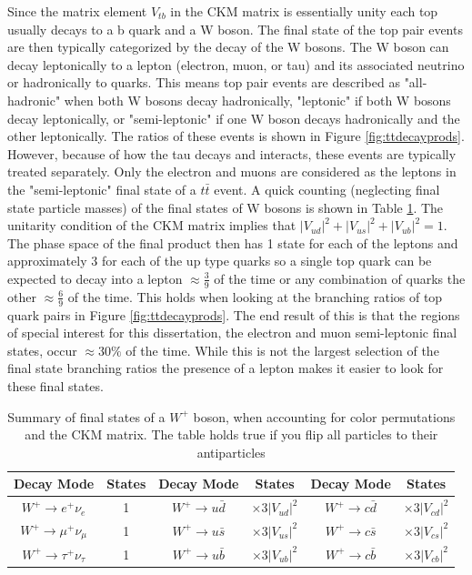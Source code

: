 Since the matrix element $V_{tb}$ in the CKM matrix is essentially unity each top usually decays to a b quark and a W boson.  The final state of the top pair events are then typically categorized by the decay of the W bosons.  The W boson can decay leptonically to a lepton (electron, muon, or tau) and its associated neutrino or hadronically to quarks.  This means top pair events are described as "all-hadronic" when both W bosons decay hadronically, "leptonic" if both W bosons decay leptonically, or "semi-leptonic" if one W boson decays hadronically and the other leptonically.  The ratios of these events is shown in Figure \ref{fig:ttdecayprods}.  However, because of how the tau decays and interacts, these events are typically treated separately.  Only the electron and muons are considered as the leptons in the "semi-leptonic" final state of a $t\bar{t}$ event.  A quick counting (neglecting final state particle masses) of the final states of W bosons  is shown in Table \ref{tab:WFinals}.  The unitarity condition of the CKM matrix implies that $|V_{ud}|^2 + |V_{us}|^2 + |V_{ub}|^2 =1$.  The phase space of the final product then has 1 state for each of the leptons and approximately 3 for each of the up type quarks so a single top quark can be expected to decay into a lepton $\approx \frac{3}{9}$ of the time or any combination of quarks the other $\approx \frac{6}{9}$ of the time.  This holds when looking at the branching ratios of top quark pairs in Figure \ref{fig:ttdecayprods}.  The end result of this is that the regions of special interest for this dissertation, the electron and muon semi-leptonic final states, occur $\approx 30\%$ of the time.  While this is not the largest selection of the final state branching ratios the presence of a lepton makes it easier to look for these final states.

\begin{table}[]
\begin{center}
\begin{tabular}{|c|c|c|c|c|c|}
 \hline 
Decay Mode           			        & States   & Decay Mode                             &  States			   &     Decay Mode 		 	   &     States                          \\   \hline
$W^+ \rightarrow e^+ \nu_e$ 	        &1          &   $W^+ \rightarrow u\bar{d}$   &  $\times 3 |V_{ud}|^2$  &   $W^+ \rightarrow c\bar{d}$  &   $\times 3 |V_{cd}|^2$\\
$W^+ \rightarrow \mu^+ \nu_\mu$   &1          &  $W^+ \rightarrow u\bar{s}$    &  $\times 3 |V_{us}|^2$   &   $W^+ \rightarrow c\bar{s}$  &    $\times 3 |V_{cs}|^2$\\
$W^+ \rightarrow \tau^+ \nu_\tau$  &1	 &  $W^+ \rightarrow u\bar{b}$    &  $\times 3 |V_{ub}|^2$  &    $W^+ \rightarrow c\bar{b}$ &  $\times 3 |V_{cb}|^2$ \\ \hline
\end{tabular}
	\caption[Summary of final states of a W boson, when accounting for color permutations and the CKM matrix]{Summary of final states of a $W^+$ boson, when accounting for color permutations and the CKM matrix.  The table holds true if you flip all particles to their antiparticles}
	\label{tab:WFinals}
\end{center}
\end{table}

